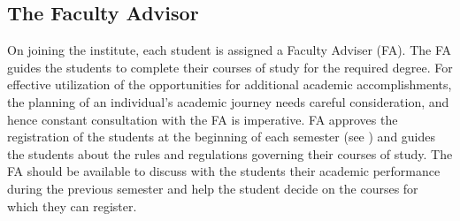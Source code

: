 \subsection{The Faculty Advisor \label{lab:Faculty Advisor}}

On joining the \gls{institute}, each \gls{student} is assigned a Faculty Adviser (FA). The FA guides the \glspl{student} to complete their courses of study for the required degree. For effective utilization of the opportunities for additional academic accomplishments, the planning of an individual’s academic journey needs careful consideration, and hence constant consultation with the FA is imperative. FA approves the registration of the \glspl{student} at the beginning of each semester (see ) and guides the \glspl{student} about the rules and regulations governing their courses of study. The FA should be available to discuss with the \glspl{student} their academic performance during the previous semester and help the \gls{student} decide on the courses for which they can register.